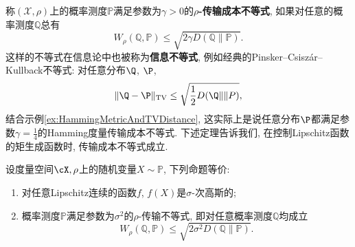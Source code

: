 称$(\mathcal{X}, \rho)$上的概率测度$\mathbb{P}$满足参数为$\gamma > 0$的\textbf{$\rho$-传输成本不等式}, 如果对任意的概率测度$\mathbb{Q}$总有
 \begin{equation}\label{eq:TransportationCostInequality}
 	W_{\rho} (\mathbb{Q}, \mathbb{P}) \leq \sqrt{2 \gamma D(\mathbb{Q} \| \mathbb{P})}.
 \end{equation}
 这样的不等式在信息论中也被称为\textbf{信息不等式}, 例如经典的Pinsker–Csiszár–Kullback不等式: 对任意分布$\Q$, $\P$, 
 \begin{equation}\label{eq:Pinsker–Csiszár–Kullback}
 	\|\Q - \P\|_{\text{TV}} \leq \sqrt{\frac{1}{2}D(\Q\|\|P)}, 
 \end{equation}
 结合示例\ref{ex:HammingMetricAndTVDistance}, 这实际上是说任意分布$\P$都满足参数$\gamma = \frac{1}{4}$的Hamming度量传输成本不等式. 
下述定理告诉我们, 在控制Lipschitz函数的矩生成函数时, 传输成本不等式成立. 

\begin{theorem}\label{thm:Bobkov-Götze}
	设度量空间$\cX, \rho$上的随机变量$X \sim \mathbb{P}$, 下列命题等价: 
	\begin{enumerate}
		\item 对任意Lipschitz连续的函数$f$, $f(X)$是$\sigma$-次高斯的;
		\item 概率测度$\mathbb{P}$满足参数为$\sigma^2$的$\rho$-传输不等式, 即对任意概率测度$\mathbb{Q}$均成立
			\begin{equation*}
				W_{\rho}(\mathbb{Q}, \mathbb{P}) \leq \sqrt{2 \sigma^2 D(\mathbb{Q} \| \mathbb{P})}. 
			\end{equation*}
	\end{enumerate}
\end{theorem}

